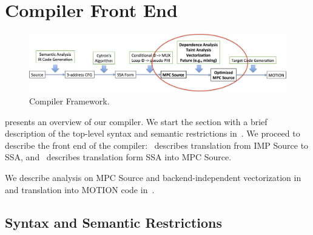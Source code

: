 

\section{\bf Compiler Front End}
\label{sec:compiler}



\begin{figure}
  \includegraphics[width=0.9\linewidth]{figs_paper_SIMD/compiler_framework.png}
  \caption{Compiler Framework.}
  \label{fig:compiler_framework}
\end{figure}

 presents an overview of our compiler.
We start the section with a brief description of the top-level syntax and semantic restrictions in~.
We proceed to describe the front end of the compiler:~
describes translation from IMP Source to SSA, and~
describes translation form SSA into MPC Source.

We describe analysis on MPC Source and backend-independent vectorization in~
and translation into MOTION code in~.

\subsection{Syntax and Semantic Restrictions}
\label{sec:syntax}

